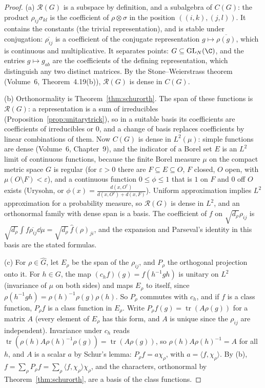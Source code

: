 \begin{proof}
(a) $\mathcal R(G)$ is a subspace by definition, and a subalgebra of $C(G)$: the product $\rho_{ij}\sigma_{kl}$ is the coefficient of $\rho\otimes\sigma$ in the position $((i,k),(j,l))$. It contains the constants (the trivial representation), and is stable under conjugation: $\overline{\rho_{ij}}$ is a coefficient of the conjugate representation
$g\mapsto\overline{\rho(g)}$, which is continuous and multiplicative. It separates points: $G\subseteq\mathrm{GL}_N(\C)$, and the entries $g\mapsto g_{ab}$ are the coefficients of the defining representation, which distinguish any two distinct matrices. By the
Stone--Weierstrass theorem (Volume~6, Theorem~4.19(b)), $\mathcal R(G)$ is dense in $C(G)$.

(b) Orthonormality is Theorem~\ref{thm:schurorth}. The span of these functions is $\mathcal R(G)$: a representation is a sum of irreducibles (Proposition~\ref{prop:unitarytrick}), so in a suitable basis its coefficients are coefficients of irreducibles or $0$,
and a change of basis replaces coefficients by linear combinations of them. Now $C(G)$ is dense in $L^2(\mu)$: simple functions are dense (Volume~6, Chapter~9), and the indicator of a Borel set $E$ is an $L^2$ limit of continuous functions, because the finite
Borel measure $\mu$ on the compact metric space $G$ is regular (for $\varepsilon>0$ there are $F\subseteq E\subseteq O$, $F$ closed, $O$ open, with $\mu(O\setminus F)<\varepsilon$), and a continuous function $0\le\phi\le1$ that is $1$ on $F$ and $0$ off $O$ exists (Urysohn,
or $\phi(x)=\frac{d(x,O^c)}{d(x,O^c)+d(x,F)}$). Uniform approximation implies $L^2$ approximation for a probability measure, so $\mathcal R(G)$ is dense in $L^2$, and an orthonormal family with dense span is a basis. The coefficient of $f$ on $\sqrt{d_\rho}\rho_{ij}$ is
$\sqrt{d_\rho}\int f\overline{\rho_{ij}}\dd\mu=\sqrt{d_\rho}\,\hat f(\rho)_{ji}$, and the expansion and Parseval's identity in this basis are the stated formulas.

(c) For $\rho\in\widehat G$, let $E_\rho$ be the span of the $\rho_{ij}$, and $P_\rho$ the orthogonal projection onto it. For $h\in G$, the map $(c_hf)(g)=f(h^{-1}gh)$ is unitary on $L^2$ (invariance of $\mu$ on both sides) and maps $E_\rho$ to itself, since
$\rho(h^{-1}gh)=\rho(h)^{-1}\rho(g)\rho(h)$. So $P_\rho$ commutes with $c_h$, and if $f$ is a class function, $P_\rho f$ is a class function in $E_\rho$. Write $P_\rho f(g)=\operatorname{tr}(A\rho(g))$ for a matrix $A$ (every element of $E_\rho$ has this form,
and $A$ is unique since the $\rho_{ij}$ are independent). Invariance under $c_h$ reads $\operatorname{tr}(\rho(h)A\rho(h)^{-1}\rho(g))=\operatorname{tr}(A\rho(g))$, so $\rho(h)A\rho(h)^{-1}=A$ for all $h$, and $A$ is a scalar $a$ by Schur's lemma: $P_\rho f=a\chi_\rho$, with
$a=\langle f,\chi_\rho\rangle$. By (b), $f=\sum_\rho P_\rho f=\sum_\rho\langle f,\chi_\rho\rangle\chi_\rho$, and the characters, orthonormal by Theorem~\ref{thm:schurorth}, are a basis of the class functions.
\end{proof}

